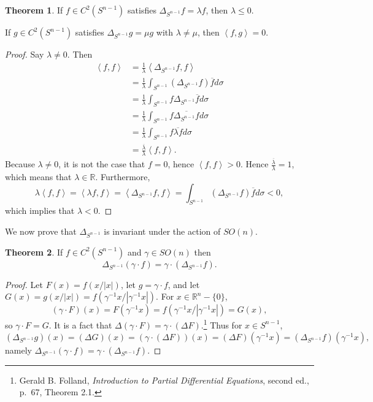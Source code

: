 \documentclass{article}
\newcommand{\inner}[2]{\left\langle #1, #2 \right\rangle}
\theoremstyle{definition}
\newtheorem{theorem}{Theorem}
\theoremstyle{definition}
\begin{document}
\begin{theorem}
If $f \in C^2(S^{n-1})$ satisfies $\Delta_{S^{n-1}}f = \lambda f$, then $\lambda \leq 0$.

If $g \in C^2(S^{n-1})$ satisfies
$\Delta_{S^{n-1}} g = \mu g$ with $\lambda \neq \mu$, then
$\inner{f}{g} = 0$.
\label{orthogonal}
\end{theorem}
\begin{proof}
Say $\lambda \neq 0$. Then
\begin{align*}
\inner{f}{f} &= \frac{1}{\lambda} \inner{\Delta_{S^{n-1}}f}{f}\\
&= \frac{1}{\lambda} \int_{S^{n-1}} (\Delta_{S^{n-1}}f) \overline{f} d\sigma\\
&=\frac{1}{\lambda} \int_{S^{n-1}} f \Delta_{S^{n-1}} \overline{f} d\sigma\\
&=\frac{1}{\lambda} \int_{S^{n-1}} f \overline{\Delta_{S^{n-1}} f} d\sigma\\
&=\frac{1}{\lambda} \int_{S^{n-1}} f \overline{\lambda f} d\sigma\\
&=\frac{\overline{\lambda}}{\lambda} \inner{f}{f}.
\end{align*}
Because $\lambda \neq 0$, it is not the case that $f =0$, hence $\inner{f}{f}>0$. Hence
$\frac{\overline{\lambda}}{\lambda}=1$, which means that $\lambda \in \mathbb{R}$.
Furthermore,
\[
\lambda \inner{f}{f} = \inner{\lambda f}{f} = \inner{\Delta_{S^{n-1}} f}{f}
=\int_{S^{n-1}} (\Delta_{S^{n-1}} f) \overline{f} d\sigma <0,
\]
which implies that $\lambda<0$. 
\end{proof}


We now prove that $\Delta_{S^{n-1}}$ is invariant under the action of $SO(n)$.

\begin{theorem}
If $f \in C^2(S^{n-1})$ and $\gamma \in SO(n)$ then
\[
\Delta_{S^{n-1}} (\gamma \cdot f) = \gamma \cdot (\Delta_{S^{n-1}} f).
\]
\end{theorem}
\begin{proof}
Let $F(x)=f(x/|x|)$, let $g = \gamma \cdot f$, and let $G(x) =g(x/|x|)= f(\gamma^{-1}x/|\gamma^{-1}x|)$.
For $x \in \mathbb{R}^n - \{0\}$,
\[
(\gamma \cdot F)(x) = F(\gamma^{-1}x) = f(\gamma^{-1}x/|\gamma^{-1}x|) = 
G(x),
\]
so $\gamma \cdot F = G$. 
It is a fact that $\Delta (\gamma \cdot F) = \gamma \cdot (\Delta F)$.\footnote{Gerald
B. Folland, {\em Introduction to Partial Differential Equations}, second ed., p.~67, Theorem 2.1.}
Thus for $x \in S^{n-1}$,
\[
(\Delta_{S^{n-1}} g)(x)=
(\Delta G)(x)= (\gamma \cdot (\Delta F))(x)
=(\Delta F)(\gamma^{-1}x)
=(\Delta_{S^{n-1}} f)(\gamma^{-1}x),
\]
namely $\Delta_{S^{n-1}}(\gamma \cdot f) = \gamma \cdot (\Delta_{S^{n-1}} f)$.
\end{proof}
\end{document}
